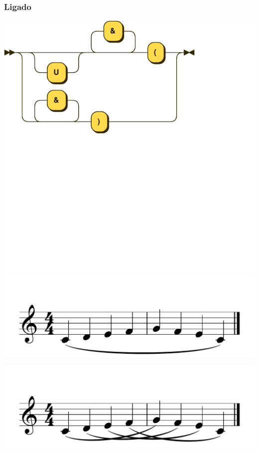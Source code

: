 \documentclass{article}
\begin{document}
\subsubsection{Ligado}

\includegraphics[scale=0.5]{figures_railroad/pdf/skern/slurs.pdf}
\includegraphics[scale=0.5]{figures_tests/pdf/skern/slur1.pdf}

\includegraphics[scale=0.5]{figures_tests/pdf/skern/slur2.pdf}
\end{document}
